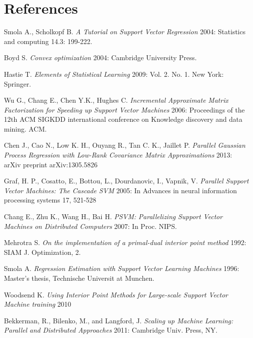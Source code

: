 \documentclass[12pt]{article}
\begin{document}
\section{References}
\renewcommand{\section}[2]{}%
 \begin{thebibliography}{}
 
  Smola A.,  Scholkopf B. {\em A Tutorial on Support Vector Regression} 2004:  Statistics and computing 14.3: 199-222.
  
  Boyd S. {\em Convex optimization}  2004: Cambridge University Press.


  Hastie T. {\em Elements of Statistical Learning} 2009:  Vol. 2. No. 1. New York: Springer.
  
   Wu G., Chang E., Chen Y.K., Hughes C.  {\em Incremental Approximate Matrix Factorization for Speeding up Support Vector Machines} 2006: Proceedings of the 12th ACM SIGKDD international conference on Knowledge discovery and data mining. ACM.

   Chen J., Cao N., Low K. H.,  Ouyang R., Tan C. K., Jaillet P.  {\em Parallel Gaussian Process Regression with Low-Rank Covariance Matrix Approximations} 2013: arXiv preprint arXiv:1305.5826
  
  Graf, H. P., Cosatto, E., Bottou, L., Dourdanovic, I., Vapnik, V.  {\em Parallel Support Vector Machines: The Cascade SVM} 2005: In Advances in neural information processing systems 17, 521-528
  
  Chang E., Zhu K., Wang H., Bai H.  {\em PSVM: Parallelizing Support Vector Machines on Distributed Computers} 2007: In Proc. NIPS.
  
   Mehrotra S.  {\em On the implementation of a primal-dual interior point method} 1992: SIAM J. Optimization, 2.
  
  Smola A. {\em Regression
Estimation with Support Vector Learning Machines} 1996: Master's thesis, Technische Universit at Munchen.
  
  Woodsend K. {\em Using Interior Point Methods for Large-scale Support Vector Machine training} 2010
  
\bibitem{}Bekkerman, R., Bilenko, M., and Langford, J. {\em Scaling up Machine Learning: Parallel and Distributed Approaches} 2011: Cambridge Univ. Press, NY.


\end{thebibliography}
\end{document}
